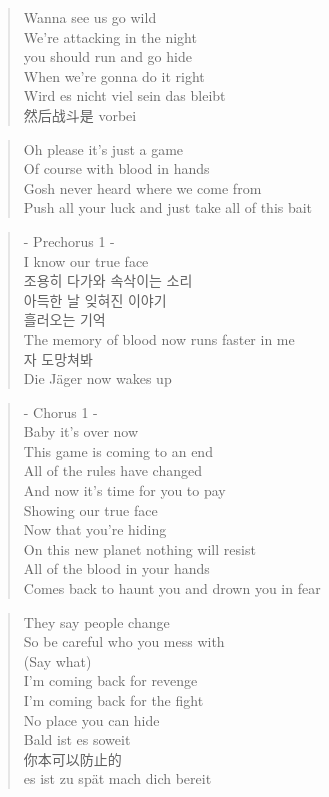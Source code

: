 \begin{verse}
Wanna see us go wild \\
We're attacking in the night\\
you should run and go hide\\
When we're gonna do it right\\
Wird es nicht viel sein das bleibt\\
然后战斗是 vorbei
\end{verse}

\begin{verse}
Oh please it's just a game\\
Of course with blood in hands\\
Gosh never heard where we come from\\
Push all your luck and just take all of this bait 
\end{verse}

\begin{verse}
- Prechorus 1 -\\
I know our true face\\
조용히 다가와 속삭이는 소리\\
아득한 날 잊혀진 이야기 \\
흘러오는 기억 \\
The memory of blood now runs faster in me\\
자 도망쳐봐\\
Die Jäger now wakes up
\end{verse}

\begin{verse}
- Chorus 1 -\\
Baby it's over now \\
This game is coming to an end\\
All of the rules have changed \\
And now it's time for you to pay\\
Showing our true face\\
Now that you're hiding \\
On this new planet nothing will resist \\
All of the blood in your hands\\
Comes back to haunt you and drown you in fear\\
\end{verse}

\begin{verse}
They say people change\\
So be careful who you mess with \\
(Say what)\\
I'm coming back for revenge\\
I'm coming back for the fight\\
No place you can hide\\
Bald ist es soweit\\
你本可以防止的\\
es ist zu spät mach dich bereit 
\end{verse}

